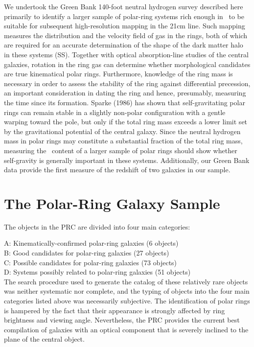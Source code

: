 We undertook the Green Bank 140-foot neutral hydrogen survey described
here primarily to identify a larger 
sample of polar-ring systems rich
enough in \HI\ to be suitable for subsequent high-resolution mapping in
the 21cm line.  
Such mapping measures the distribution and the velocity field of gas in
the rings, both of which are required for an accurate determination of
the shape of the dark matter halo in these systems (\cf SS). 
Together with optical absorption-line studies of the central galaxies,
rotation in the ring gas can determine whether morphological candidates 
are true kinematical polar rings. 
Furthermore, knowledge of 
the ring mass is necessary in order to assess the stability of the ring 
against differential precession, an important consideration in dating 
the ring and hence, presumably, measuring the time since its formation.  
Sparke (1986) has shown that self-gravitating polar rings can remain
stable in a slightly non-polar configuration with a gentle warping
toward the pole, but only if the total ring mass exceeds a lower limit
set by the gravitational potential of the central galaxy.
Since the neutral hydrogen mass in polar rings may 
constitute a substantial fraction of the total ring mass, 
measuring the \HI\ content of a larger sample of polar rings should
show whether self-gravity is generally important in these systems.  
Additionally, our Green Bank data provide the first 
measure of the redshift of two galaxies in our sample.  


\section{The Polar-Ring Galaxy Sample}
\medskip

The objects in the 
PRC are divided into four main categories: \smallskip

A:  Kinematically-confirmed polar-ring galaxies (6 objects) \\
\indent B:  Good candidates for polar-ring galaxies (27 objects) \\
\indent C:  Possible candidates for polar-ring galaxies (73 objects) \\
\indent D:  Systems possibly related to polar-ring galaxies (51 objects)\\

The search procedure used to generate the catalog of these relatively rare 
objects was neither systematic nor complete, and the typing of objects into 
the four main categories listed above was necessarily subjective.  
The identification of polar rings is hampered by the fact that their 
appearance is strongly affected by ring brightness and viewing angle. 
Nevertheless, the PRC provides the current best compilation of 
galaxies with an optical component that is severely inclined to the 
plane of the central object.  

